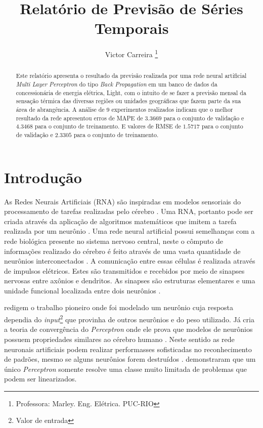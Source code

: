 \documentclass[journal, a4paper]{IEEEtran}
\begin{document}
	\title{Relatório de Previsão de Séries Temporais}
	\author{Victor Carreira
	\thanks{Professora: Marley. Eng. Elétrica. PUC-RIO}}
	\maketitle

\begin{abstract}
	Este relatório apresenta o resultado da previsão realizada por uma rede neural artificial \textit{Multi Layer Perceptron} do tipo \textit{Back Propagation} em um banco de dados da concessionária de energia elétrica, Light, com o intuito de se fazer a previsão mensal da sensação térmica das diversas regiões ou unidades geográficas que fazem parte da sua área de abrangência. A análise de $9$ experimentos realizados indicam que o melhor resultado da rede apresentou erros de MAPE de $3.3669$ para o conjunto de validação e $4.3468$ para o conjunto de treinamento. E valores de RMSE de $1.5717$ para o conjunto de validação e $2.3305$ para o conjunto de treinamento.
\end{abstract}


\section{Introdução}
    As Redes Neurais Artificiais (RNA) são inspiradas em modelos sensoriais do processamento de tarefas realizadas pelo cérebro \citep{Hagan1996}. Uma RNA, portanto pode ser criada através da aplicação de algoritmos matemáticos que imitem a tarefa realizada por um neurônio \citep{Nedjah2016}. Uma rede neural artificial possui semelhanças com a rede biológica presente no sistema nervoso central, neste o cômputo de informações realizado do cérebro é feito através de uma vasta quantidade de neurônios interconectados \citep{Feldman1988,Poulton2002}. A comunicação entre essas células é realizada através de impulsos elétricos. Estes são transmitidos e recebidos por meio de sinapses nervosas entre axônios e dendritos. As sinapses são estruturas elementares e uma unidade funcional localizada entre dois neurônios \citep{Krogh2008}.

	\citet{McCulloch1943} redigem o trabalho pioneiro onde foi modelado um neurônio cuja resposta dependia do \textit{input}\footnote{Valor de entrada} que provinha de outros neurônios e do peso utilizado.  Já \citet{Rosenblatt1962} cria a teoria de convergência do \textit{Perceptron} onde ele prova que modelos de neurônios possuem propriedades similares ao cérebro humano \citep{Kanal2001}. Neste sentido as rede neuronais artificiais podem realizar performasses sofisticadas no reconhecimento de padrões, mesmo se alguns neurônios forem destruídos \citep{Levy1997}. \citet{Minsky1969} demonstraram que um único  \textit{Perceptron} somente resolve uma classe muito limitada de problemas que podem ser linearizados.
	
\end{document}
